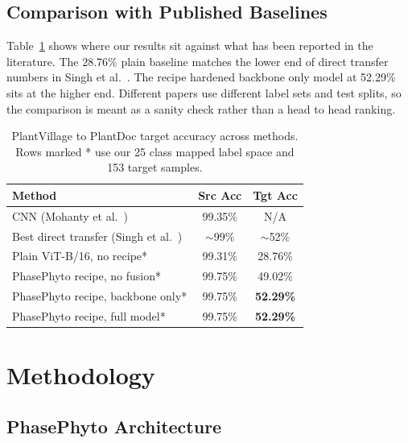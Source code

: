 \documentclass[conference]{IEEEtran}
\begin{document}
\subsection{Comparison with Published Baselines}

Table~\ref{tab:literature} shows where our results sit against what has been reported in the literature. The 28.76\% plain baseline matches the lower end of direct transfer numbers in Singh et al.~\cite{Singh2020}. The recipe hardened backbone only model at 52.29\% sits at the higher end. Different papers use different label sets and test splits, so the comparison is meant as a sanity check rather than a head to head ranking.

\begin{table}[ht]
\caption{PlantVillage to PlantDoc target accuracy across methods. Rows marked * use our 25 class mapped label space and 153 target samples.}
\label{tab:literature}
\centering
\begin{tabular}{lcc}
\toprule
Method & Src Acc & Tgt Acc \\
\midrule
CNN (Mohanty et al.~\cite{Mohanty2016}) & 99.35\% & N/A \\
Best direct transfer (Singh et al.~\cite{Singh2020}) & $\sim$99\% & $\sim$52\% \\
\midrule
Plain ViT-B/16, no recipe* & 99.31\% & 28.76\% \\
PhasePhyto recipe, no fusion* & 99.75\% & 49.02\% \\
PhasePhyto recipe, backbone only* & 99.75\% & \textbf{52.29\%} \\
PhasePhyto recipe, full model* & 99.75\% & \textbf{52.29\%} \\
\bottomrule
\end{tabular}
\end{table}

\section{Methodology}
\label{sec:method}

\subsection{PhasePhyto Architecture}
\end{document}
